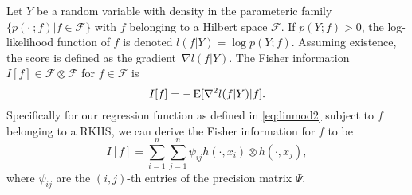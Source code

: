 Let $Y$ be a random variable with density in the parameteric family $\{p(\cdot \ ;f) | f \in \mathcal F \}$ with $f$ belonging to a Hilbert space $\mathcal F$. If $p(Y;f) > 0$, the log-likelihood function of $f$ is denoted $l(f|Y) = \log p(Y;f)$. Assuming existence, the score is defined as the gradient\footnotemark \ $\nabla l(f|Y)$.  The Fisher information $I[f] \in \mathcal F \otimes \mathcal F$ for $f \in \mathcal F$ is
\[
	I[f] = -\operatorname{E}[\nabla^2 l(f|Y) | f].
\]
Specifically for our regression function as defined in \eqref{eq:linmod2} subject to $f$ belonging to a RKHS, we can derive the Fisher information for $f$ to be 
\[
	I[f] = \sum_{i=1}^n\sum_{j=1}^n \psi_{ij} h(\cdot,x_i) \otimes h(\cdot,x_j),
\]
where $\psi_{ij}$ are the $(i,j)$-th entries of the precision matrix $\Psi$.


